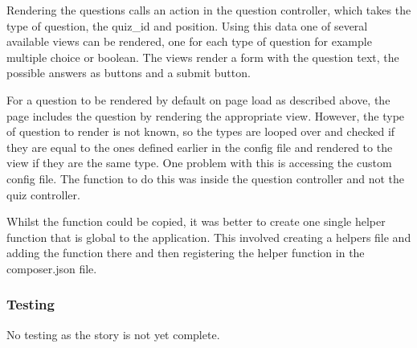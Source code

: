 Rendering the questions calls an action in the question controller, which takes the type of question, the quiz\_id and position. Using this data one of several available views can be rendered, one for each type of question for example multiple choice or boolean. The views render a form with the question text, the possible answers as buttons and a submit button.

For a question to be rendered by default on page load as described above, the page includes the question by rendering the appropriate view. However, the type of question to render is not known, so the types are looped over and checked if they are equal to the ones defined earlier in the config file and rendered to the view if they are the same type. One problem with this is accessing the custom config file. The function to do this was inside the question controller and not the quiz controller. 

Whilst the function could be copied, it was better to create one single helper function that is global to the application. This involved creating a helpers file and adding the function there and then registering the helper function in the composer.json file\cite{laravel-helper-function}.

\subsubsection{Testing}
No testing as the story is not yet complete.
\newpage
